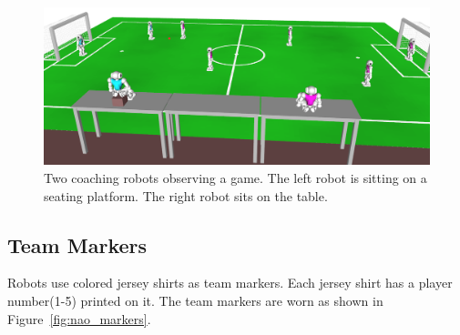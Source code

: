\documentclass[12pt]{article}
\begin{document}
\begin{figure}[t]
\centerline{\includegraphics[width=\columnwidth]{figs/coaching-robots}}
\caption{Two coaching robots observing a game. The left robot is sitting on a seating platform. The right robot sits on the table.}
\label{fig:coaches}
\end{figure}
 

\subsection{Team Markers}
\label{sec:team_markers}

Robots use colored jersey shirts as team markers. Each jersey shirt has a player number(1-5) printed on it.  The team markers are worn as shown in Figure~\ref{fig:nao_markers}.
\end{document}
